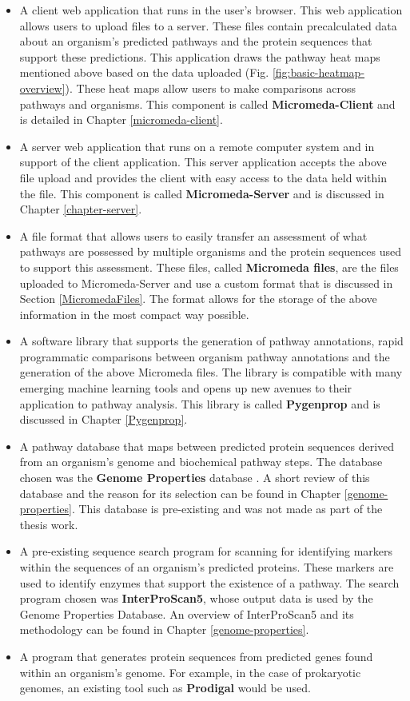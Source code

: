 \begin{itemize}
\item A client web application that runs in the user's browser. This web application allows users to upload files to a server. These files contain precalculated data about an organism's predicted pathways and the protein sequences that support these predictions. This application draws the pathway heat maps mentioned above based on the data uploaded (Fig. \ref{fig:basic-heatmap-overview}). These heat maps allow users to make comparisons across pathways and organisms. This component is called \textbf{Micromeda-Client} and is detailed in Chapter \ref{micromeda-client}.
\item A server web application that runs on a remote computer system and in support of the client application. This server application accepts the above file upload and provides the client with easy access to the data held within the file. This component is called \textbf{Micromeda-Server} and is discussed in Chapter \ref{chapter-server}.
\item A file format that allows users to easily transfer an assessment of what pathways are possessed by multiple organisms and the protein sequences used to support this assessment. These files, called \textbf{Micromeda files}, are the files uploaded to Micromeda-Server and use a custom format that is discussed in Section \ref{MicromedaFiles}. The format allows for the storage of the above information in the most compact way possible.
\item A software library that supports the generation of pathway annotations, rapid programmatic comparisons between organism pathway annotations and the generation of the above Micromeda files. The library is compatible with many emerging machine learning tools and opens up new avenues to their application to pathway analysis. This library is called \textbf{Pygenprop} and is discussed in Chapter \ref{Pygenprop}.
\item A pathway database that maps between predicted protein sequences derived from an organism's genome and biochemical pathway steps. The database chosen was the \textbf{Genome Properties} database \cite{richardson2018genome}. A short review of this database and the reason for its selection can be found in Chapter \ref{genome-properties}. This database is pre-existing and was not made as part of the thesis work.
\item A pre-existing sequence search program for scanning for identifying markers within the sequences of an organism's predicted proteins. These markers are used to identify enzymes that support the existence of a pathway. The search program chosen was \textbf{InterProScan5}, whose output data is used by the Genome Properties Database. An overview of InterProScan5 \cite{jones2014interproscan} and its methodology can be found in Chapter \ref{genome-properties}.
\item A program that generates protein sequences from predicted genes found within an organism's genome. For example, in the case of prokaryotic genomes, an existing tool such as \textbf{Prodigal} \cite{hyatt2010prodigal} would be used. 
\end{itemize}

